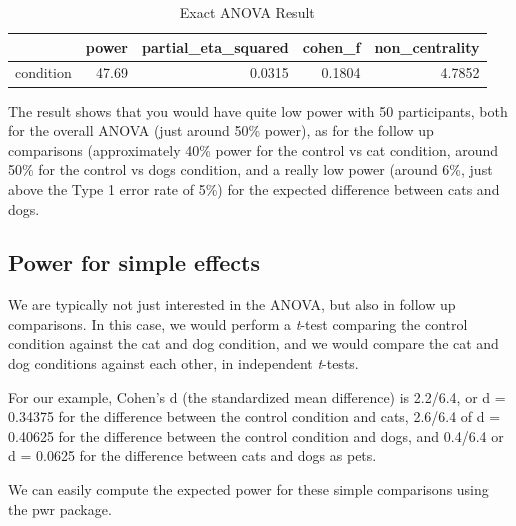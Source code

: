 \documentclass[]{book}
\newenvironment{Shaded}{\begin{snugshade}}{\end{snugshade}}
\newcommand{\DataTypeTok}[1]{\textcolor[rgb]{0.13,0.29,0.53}{#1}}
\newcommand{\DecValTok}[1]{\textcolor[rgb]{0.00,0.00,0.81}{#1}}
\newcommand{\FloatTok}[1]{\textcolor[rgb]{0.00,0.00,0.81}{#1}}
\newcommand{\KeywordTok}[1]{\textcolor[rgb]{0.13,0.29,0.53}{\textbf{#1}}}
\newcommand{\NormalTok}[1]{#1}
\newcommand{\OperatorTok}[1]{\textcolor[rgb]{0.81,0.36,0.00}{\textbf{#1}}}
\newcommand{\StringTok}[1]{\textcolor[rgb]{0.31,0.60,0.02}{#1}}
\begin{document}
\begin{table}[t]

\caption{\label{tab:unnamed-chunk-29}Exact ANOVA Result}
\centering
\begin{tabular}{l|r|r|r|r}
\hline
  & power & partial\_eta\_squared & cohen\_f & non\_centrality\\
\hline
condition & 47.69 & 0.0315 & 0.1804 & 4.7852\\
\hline
\end{tabular}
\end{table}

The result shows that you would have quite low power with 50 participants, both for the overall ANOVA (just around 50\% power), as for the follow up comparisons (approximately 40\% power for the control vs cat condition, around 50\% for the control vs dogs condition, and a really low power (around 6\%, just above the Type 1 error rate of 5\%) for the expected difference between cats and dogs.

\hypertarget{power-for-simple-effects}{%
\subsection{Power for simple effects}\label{power-for-simple-effects}}

We are typically not just interested in the ANOVA, but also in follow up comparisons. In this case, we would perform a \emph{t}-test comparing the control condition against the cat and dog condition, and we would compare the cat and dog conditions against each other, in independent \emph{t}-tests.

For our example, Cohen's d (the standardized mean difference) is 2.2/6.4, or d = 0.34375 for the difference between the control condition and cats, 2.6/6.4 of d = 0.40625 for the difference between the control condition and dogs, and 0.4/6.4 or d = 0.0625 for the difference between cats and dogs as pets.

We can easily compute the expected power for these simple comparisons using the pwr package.

\begin{Shaded}
\end{Shaded}
\end{document}
